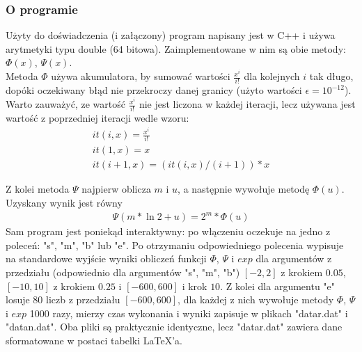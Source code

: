 \documentclass[11pt,wide]{mwart}
\begin{document}
\subsubsection{O programie}
Użyty do doświadczenia (i załączony) program napisany jest w C++ i używa arytmetyki typu double (64 bitowa). Zaimplementowane w nim są obie metody: $\Phi(x)$, $\Psi(x)$. \\
\indent Metoda $\Phi$ używa akumulatora, by sumować wartości $\frac{x^i}{i!}$ dla kolejnych $i$ tak długo, dopóki oczekiwany błąd nie przekroczy danej granicy (użyto wartości $\epsilon = 10^{-12}$). Warto zauważyć, ze wartość $\frac{x^i}{i!}$ nie jest liczona w każdej iteracji, lecz używana jest wartość z poprzedniej iteracji wedle wzoru: \\
\begin{gather}
        it(i, x) = \frac{x^i}{i!}\\
        it(1, x) = x\\
                it(i+1, x) = (it(i, x)/(i+1))*x
\label{eq:phiblad}
\end{gather}

\indent Z kolei metoda $\Psi$ najpierw oblicza $m$ i $u$, a następnie wywołuje metodę $\Phi(u)$. Uzyskany wynik jest równy \\
\begin{gather}
        \Psi(m*\ln 2 + u) = 2^m * \Phi(u)
\label{eq:psiblad}
\end{gather}
\indent Sam program jest poniekąd interaktywny: po włączeniu oczekuje na jedno z poleceń: "s", "m", "b" lub "e". Po otrzymaniu odpowiedniego polecenia wypisuje na standardowe wyjście wyniki obliczeń funkcji $\Phi$, $\Psi$ i $exp$ dla argumentów z przedziału (odpowiednio dla argumentów "s", "m", "b") $[-2,2]$ z krokiem $0.05$, $[-10,10]$ z krokiem $0.25$ i $[-600,600]$ i krok $10$. Z kolei dla argumentu "e" losuje 80 liczb z przedziału $[-600, 600]$, dla każdej z nich wywołuje metody $\Phi$, $\Psi$ i $exp$ 1000 razy, mierzy czas wykonania i wyniki zapisuje w plikach "datar.dat" i "datan.dat". Oba pliki są praktycznie identyczne, lecz "datar.dat" zawiera dane sformatowane w postaci tabelki \LaTeX'a.
\end{document}
